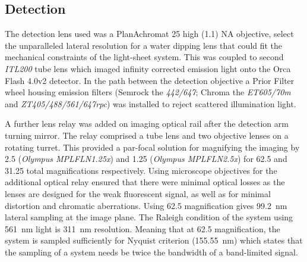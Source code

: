 \subsection{Detection}

The detection lens used was a PlanAchromat \SI{25}{\times} high (\SI{1.1}{}) \gls{NA} objective, select the unparalleled lateral resolution for a water dipping lens that could fit the mechanical constraints of the \gls{light-sheet} system.
This was coupled to second \emph{ITL200} tube lens which imaged infinity corrected emission light onto the Orca Flash 4.0v2 detector.
In the path between the detection objective a Prior Filter wheel housing emission filters (Semrock the \emph{442/647};
Chroma the \emph{ET605/70m} and \emph{ZT405/488/561/647rpc}) was installed to reject scattered illumination light.

A further lens relay was added on \gls{imaging optical rail} after the \gls{detection arm} turning mirror.
The relay comprised a tube lens and two objective lenses on a rotating turret.
This provided a par-focal solution for magnifying the imaging by \SI{2.5}{\times} (\emph{Olympus MPLFLN1.25x}) and \SI{1.25}{\times} (\emph{Olympus MPLFLN2.5x}) for \SI{62.5}{\times} and \SI{31.25}{\times} total magnifications respectively.
Using microscope objectives for the additional optical relay ensured that there were minimal optical losses as the lenses are designed for the weak fluorescent signal, as well as for minimal distortion and chromatic aberrations.
Using \SI{62.5}{\times} magnification gives \SI{99.2}{\nano\meter} lateral sampling at the image plane.
The Raleigh condition of the system using \SI{561}{\nano\meter} light is \SI{311}{\nano\meter} resolution.
Meaning that at \SI{62.5}{\times} magnification, the system is sampled sufficiently for Nyquist criterion (\SI{155.55}{\nano\meter}) which states that the sampling of a system needs be twice the bandwidth of a band-limited signal.
